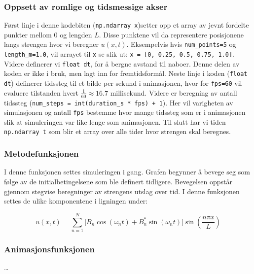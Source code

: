 \subsubsection{Oppsett av romlige og tidsmessige akser}
Først linje i denne kodebiten (\verb|np.ndarray x|)setter opp et array av jevnt fordelte punkter mellom $0$ og lengden $L$. Disse punktene vil da representere
posisjonene langs strengen hvor vi beregner $u(x,t)$. Eksempelvis hvis \verb|num_points=5| og \verb|length_m=1.0|, vil arrayet til \verb|x| se slik ut: \verb|x = [0, 0.25, 0.5, 0.75, 1.0]|.
Videre definerer vi \verb|float dt|, for å bergne avstand til naboer. Denne delen av koden er ikke i bruk, men lagt inn for fremtidsformål. Neste 
linje i koden (\verb|float dt|) definerer tidssteg til et bilde per sekund i animasjonen, hvor for \verb|fps=60| vil evaluere tilstanden hvert
$\frac{1}{60} \approx 16.7$ millisekund. Videre er beregning av antall tidssteg (\verb|num_steps = int(duration_s * fps) + 1|). Her vil varigheten
av simulasjonen og antall \verb|fps| bestemme hvor mange tidssteg som er i animasjonen slik at simuleringen var like lenge som animasjonen. Til
slutt har vi tiden \verb|np.ndarray t| som blir et array over alle tider hvor strengen skal beregnes.

\subsubsection{Metodefunksjonen}
I denne funksjonen settes simuleringen i gang. Grafen begynner å bevege seg som følge av de initialbetingelsene som ble definert tidligere. 
Bevegelsen oppstår gjennom stegvise beregninger av strengens utslag over tid. I denne funksjonen settes de ulike komponentene i ligningen
under:

\begin{equation*}
  u(x,t) = \sum_{n=1}^{N} 
  \big[ B_n \cos(\omega_n t) + B_n^{*} \sin(\omega_n t) \big]
  \sin\!\left(\frac{n\pi x}{L}\right)
\end{equation*}


\subsubsection{Animasjonsfunksjonen}
\dots
